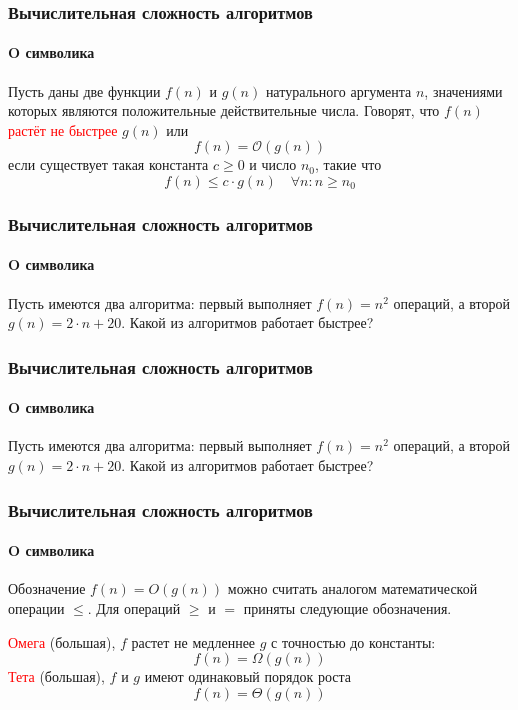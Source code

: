 \documentclass[aspectratio=169]{beamer}
\begin{document}
\begin{frame}
\frametitle{Вычислительная сложность алгоритмов}
\framesubtitle{O символика}
\justifying
Пусть даны две функции $f(n)$ и $g(n)$ натурального аргумента $n$, значениями которых являются положительные действительные числа.\newline\newline
Говорят, что $f(n)$ \textcolor{red}{растёт не быстрее} $g(n)$ или $$f(n) = \mathcal{O}(g(n))$$если существует такая константа $c \geq 0$ и число $n_0$, такие что $$f(n) \leq c \cdot g(n) \quad \forall n : n \geq n_0 $$

\end{frame}	

\begin{frame}
\frametitle{Вычислительная сложность алгоритмов}
\framesubtitle{O символика}
\justifying
Пусть имеются два алгоритма: первый выполняет $f(n) = n^2$ операций, а второй $g(n) = 2\cdot n + 20$. Какой из алгоритмов работает быстрее?

\end{frame}

\begin{frame}
\frametitle{Вычислительная сложность алгоритмов}
\framesubtitle{O символика}
\justifying
Пусть имеются два алгоритма: первый выполняет $f(n) = n^2$ операций, а второй $g(n) = 2\cdot n + 20$. Какой из алгоритмов работает быстрее?

\begin{figure}
    \captionsetup[subfigure]{labelformat=empty}
    \centering
\end{figure}
\end{frame}

\begin{frame}
\frametitle{Вычислительная сложность алгоритмов}
\framesubtitle{O символика}
\justifying
Обозначение $f(n) = O(g(n))$ можно считать аналогом математической операции $\leq$. Для операций $\geq$ и $=$ приняты следующие обозначения.\newline\newline

\textcolor{red}{Омега} (большая), $f$ растет не медленнее $g$ с точностью до константы:
$$f(n) = \Omega(g(n))$$\newline
\textcolor{red}{Тета} (большая), $f$ и $g$ имеют одинаковый порядок роста\newline
$$f(n) = \Theta(g(n))$$
\end{frame}
\end{document}
